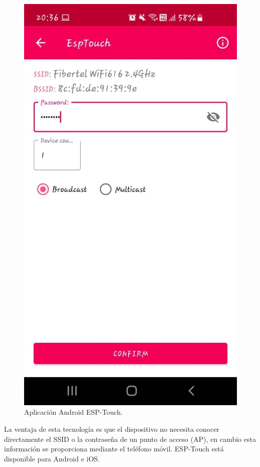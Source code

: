 \begin{figure}[htpb]
	\centering
	\includegraphics[scale=.5]{./Figures/EspTouch.jpeg}
	\caption{Aplicación Android ESP-Touch.}
	\label{fig:EspTouch}
\end{figure}

La ventaja de esta tecnología es que el dispositivo no necesita conocer directamente el SSID o la contraseña de un punto de acceso (AP), en cambio esta información se proporciona mediante el teléfono móvil. ESP-Touch está disponible para Android e iOS.


